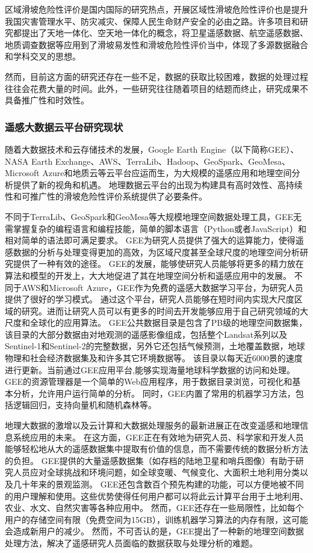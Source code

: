 \documentclass[a4paper,zihao=-4]{article}
\begin{document}
区域滑坡危险性评价是国内国际的研究热点，开展区域性滑坡危险性评价也是提升我国灾害管理水平、防灾减灾、保障人民生命财产安全的必由之路。许多项目和研究都提出了天地一体化、空天地一体化的概念，将卫星遥感数据、航空遥感数据、地质调查数据等应用到了滑坡易发性和滑坡危险性评价当中，体现了多源数据融合和学科交叉的思想。

然而，目前这方面的研究还存在一些不足，数据的获取比较困难，数据的处理过程往往会花费大量的时间。此外，一些研究往往随着项目的结题而终止，研究成果不具备推广性和时效性。

\subsubsection{遥感大数据云平台研究现状}

随着大数据技术和云存储技术的发展，Google Earth Engine（以下简称GEE）、NASA Earth Exchange、AWS、TerraLib、Hadoop、GeoSpark、GeoMesa、Microsoft Azure和地质云等云平台应运而生，为大规模的遥感应用和地理空间分析提供了新的视角和机遇\cite{Hird2017}。
地理数据云平台的出现为构建具有高时效性、高持续性和可推广性的滑坡危险性评价系统提供了必要条件。

不同于TerraLib、GeoSpark和GeoMesa等大规模地理空间数据处理工具，GEE无需掌握复杂的编程语言和编程技能，简单的脚本语言（Python或者JavaScript）和相对简单的语法即可满足要求。
GEE为研究人员提供了强大的运算能力，使得遥感数据的分析与处理变得更加的高效，为区域尺度甚至全球尺度的地理空间分析研究提供了一种有效的途径\cite{Tamiminia20_Google}。
GEE的发展，能够使研究人员能够将更多的精力放在算法和模型的开发上，大大地促进了其在地理空间分析和遥感应用中的发展\cite{Tamiminia20_Google}。
不同于AWS和Microsoft Azure，GEE作为免费的遥感大数据学习平台，为研究人员提供了很好的学习模式\cite{Amani20_Google}。
通过这个平台，研究人员能够在短时间内实现大尺度区域的研究。进而让研究人员可以有更多的时间去开发能够应用于自己研究领域的大尺度和全球化的应用算法。
GEE公共数据目录是包含了PB级的地理空间数据集，该目录的大部分数据由对地观测的遥感影像组成，包括整个Landsat系列以及Sentinel-1和Sentinel-2的完整数据，另外它还包括气候预测，土地覆盖数据，地球物理和社会经济数据集及和许多其它环境数据等\cite{Tamiminia20_Google}。
该目录以每天近6000景的速度进行更新。当前通过GEE应用平台,能够实现海量地球科学数据的访问和处理\cite{Tamiminia20_Google}。
GEE的资源管理器是一个简单的Web应用程序，用于数据目录浏览，可视化和基本分析，允许用户运行简单的分析。
同时，GEE内置了常用的机器学习方法，包括逻辑回归，支持向量机和随机森林等\cite{Tamiminia20_Google}。

地理大数据的激增以及云计算和大数据处理服务的最新进展正在改变遥感和地理信息系统应用的未来\cite{Amani20_Google}。
在这方面，GEE正在有效地为研究人员、科学家和开发人员能够轻松地从大的遥感数据集中提取有价值的信息，而不需要传统的数据分析方法的负担。
GEE提供的大量遥感数据集（如存档的陆地卫星和哨兵图像）有助于研究人员应对全球挑战和环境问题，如全球变暖、气候变化、大面积土地利用分类以及几十年来的景观监测。
GEE还包含数百个预先构建的功能，可以方便地被不同的用户理解和使用。这些优势使得任何用户都可以将此云计算平台用于土地利用、农业、水文、自然灾害等各种应用中。
然而，GEE还存在一些局限性，比如每个用户的存储空间有限（免费空间为15GB），训练机器学习算法的内存有限，这可能会造成新用户的减少\cite{Amani20_Google}。
然而，不可否认的是，GEE提出了一种新的地理空间数据处理方法，解决了遥感研究人员面临的数据获取与处理分析的难题\cite{Amani20_Google}。
\end{document}
